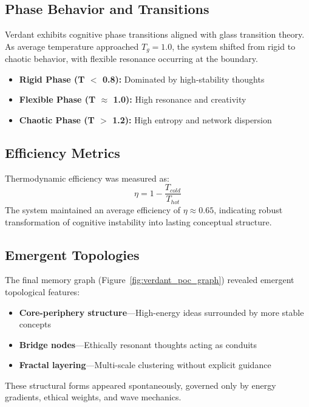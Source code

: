 \documentclass{article}
\begin{document}
\subsection{Phase Behavior and Transitions}

Verdant exhibits cognitive phase transitions aligned with glass transition theory. As average temperature approached $T_g = 1.0$, the system shifted from rigid to chaotic behavior, with flexible resonance occurring at the boundary.

\begin{itemize}
    \item \textbf{Rigid Phase (T $<$ 0.8):} Dominated by high-stability thoughts
    \item \textbf{Flexible Phase (T $\approx$ 1.0):} High resonance and creativity
    \item \textbf{Chaotic Phase (T $>$ 1.2):} High entropy and network dispersion
\end{itemize}

\subsection{Efficiency Metrics}

Thermodynamic efficiency was measured as:
\[
\eta = 1 - \frac{T_{cold}}{T_{hot}}
\]
The system maintained an average efficiency of $\eta \approx 0.65$, indicating robust transformation of cognitive instability into lasting conceptual structure.

\subsection{Emergent Topologies}

The final memory graph (Figure~\ref{fig:verdant_poc_graph}) revealed emergent topological features:

\begin{itemize}
    \item \textbf{Core-periphery structure}—High-energy ideas surrounded by more stable concepts
    \item \textbf{Bridge nodes}—Ethically resonant thoughts acting as conduits
    \item \textbf{Fractal layering}—Multi-scale clustering without explicit guidance
\end{itemize}

These structural forms appeared spontaneously, governed only by energy gradients, ethical weights, and wave mechanics.
\end{document}
